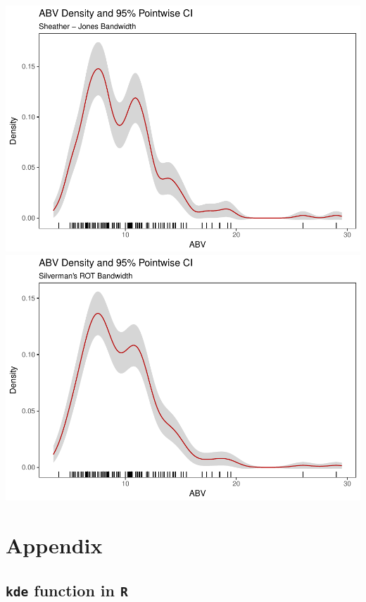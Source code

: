 \documentclass[]{article}
\begin{document}
\includegraphics{FinalReport_files/figure-latex/unnamed-chunk-15-1.pdf}
\includegraphics{FinalReport_files/figure-latex/unnamed-chunk-15-2.pdf}

\section{Appendix}\label{appendix}

\subsection{\texorpdfstring{\texttt{kde} function in
\texttt{R}}{kde function in R}}\label{kde-function-in-r}
\end{document}
